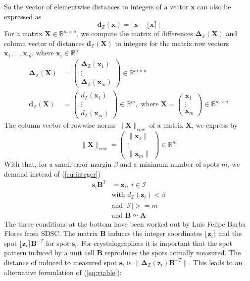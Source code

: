 \documentclass[a4paper,10pt]{article}
\newcommand{\vect}[1]{\mathbf{#1}}
\newcommand{\mat}[1]{\mathbf{#1}}
\newcommand{\round}[1]{\lfloor #1 \rceil}
\newcommand{\distZ}[1]{d_\mathbb{Z}(#1)}
\newcommand{\distvecZ}[1]{\vect{d}_\mathbb{Z}(#1)}
\newcommand{\diffvecZ}[1]{\vect{\Delta}_\mathbb{Z}(#1)}
\begin{document}
%
So the vector of elementwise distances to integers of a vector $\vect{x}$ can also be expressed as
%
\[
  \distvecZ{\vect{x}} = |\, \vect{x} - \round{\vect{x}}\,|
\]
%
For a matrix $\mat{X}\in \mathbb{R}^{m\times n}$, we compute the matrix of differences $\diffvecZ{\mat{X}}$ and column vector of distances $\distvecZ{\mat{X}}$ to integers for the matrix row vectors $\vect{x}_1,\hdots ,\vect{x}_m$, where $\vect{x}_i\in \mathbb{R}^n$
%
\[
 \begin{split}
  \diffvecZ{\mat{X}} &= \begin{pmatrix} \diffvecZ{\vect{x}_1} \\ \vdots \\ \diffvecZ{\vect{x}_m} \end{pmatrix}\in \mathbb{R}^{m\times n} \\
  \distvecZ{\mat{X}} &= \begin{pmatrix} \distZ{\vect{x}_1} \\ \vdots \\ \distZ{\vect{x}_m} \end{pmatrix}\in \mathbb{R}^m,
     \text{ where }\mat{X} = \begin{pmatrix} \vect{x}_1 \\ \vdots \\ \vect{x}_m \end{pmatrix}\in \mathbb{R}^{m\times n}
 \end{split}
\]
%
The column vector of rowwise norms $\|\mat{X}\|_{row}$ of a matrix $\mat{X}$, we express by
%
\[
 \|\mat{X}\|_{row} = \begin{pmatrix} \|\vect{x}_1\| \\ \vdots \\ \|\vect{x}_m\| \end{pmatrix}\in \mathbb{R}^m
\]
%
With that, for a small error margin $\beta$ and a minimum number of spots $m$, we demand instead of (\ref{eq:integer})
%
\begin{equation}\label{eq:viable}
 \begin{split}
  \vect{s}_i \mat{B}^T &= \vect{z}_i,\ i \in \mathcal{I} \\
  &\text{with }\distZ{\vect{z}_i} < \beta \\
  &\text{and }|\mathcal{I}| >= m \\
  &\text{and }\mat{B} \simeq \mat{A}
 \end{split}
\end{equation}
%
The three conditions at the bottom have been worked out by Luis Felipe Barba Flores from SDSC. The matrix $\mat{B}$ induces the integer coordinates $\round{\vect{z}_i}$ and the spot $\round{\vect{z}_i}\mat{B}^{-T}$ for spot $\vect{s}_i$. For crystalographers it is important that the spot pattern induced by a unit cell $\mat{B}$ reproduces the spots actually measured. The distance of induced to measured spot $\vect{s}_i$ is $\|\diffvecZ{\vect{z}_i}\mat{B}^{-T}\|$. This leads to an alternative formulation of (\ref{eq:viable}):
\end{document}
